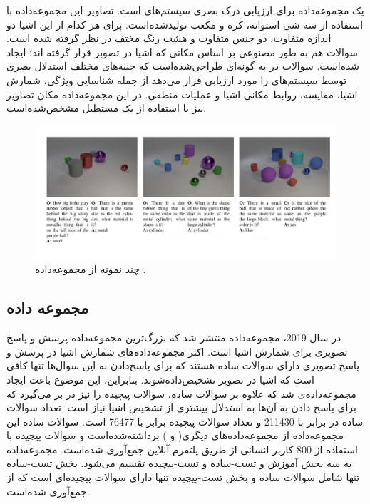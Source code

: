  یک مجموعه‌داده برای ارزیابی درک بصری سیستم‌های 
  است. تصاویر این مجموعه‌داده با استفاده از سه شی استوانه، کره و مکعب تولیدشده‌است. برای هر کدام از این اشیا دو اندازه متفاوت، دو جنس متفاوت و هشت رنگ مختف در نظر گرفته شده است. سوالات هم به طور مصنوعی بر اساس مکانی که اشیا در تصوبر قرار گرفته اند؛ ایجاد شده‌است. سوالات در
   به گونه‌ای طراحی‌شده‌است که جنبه‌های مختلف استدلال بصری توسط سیستم‌های 
   را مورد ارزیابی قرار می‌دهد از جمله شناسایی ویژگی، شمارش اشیا، مقایسه، روابط مکانی اشیا و عملیات منطقی. در این مجموعه‌داده مکان تصاویر نیز با استفاده از یک مستطیل مشخص‌شده‌است.
   
   \begin{figure}[h]
   	\centerline{\includegraphics[scale=0.4]{images/CLEVR.JPG}}
   	\caption{چند نمونه از مجموعه‌داده \cite{johnson2017clevr}.}
   	\label{fig:CLEVRExample}
   \end{figure}

\subsection{مجموعه داده \cite{acharya2019tallyqa}}

	در سال 2019، مجموعه‌داده 
منتشر شد که بزرگ‌ترین مجموعه‌داده پرسش و پاسخ تصویری برای شمارش اشیا است. اکثر مجموعه‌داده‌های شمارش اشیا در پرسش و پاسخ تصویری دارای سوالات ساده هستند که برای پاسخ‌دادن به این سوال‌‌ها تنها کافی است که اشیا در تصویر تشخیص‌داده‌شوند. بنابراین، این موضوع باعث ایجاد مجموعه‌داده‌ی 
  شد که علاوه بر سوالات ساده، سوالات پیچیده را نیز در بر می‌گیرد که برای پاسخ دادن به آن‌ها به استدلال بیشتری از تشخیص اشیا نیاز است. تعداد سوالات ساده در
  برابر با 211430 و تعداد سوالات پیچیده برابر با 76477 است. سوالات ساده این مجموعه‌داده از مجموعه‌داده‌های دیگری( 
   \cite{goyal2017making}
  و 
   \cite{krishna2017visual}
  ) برداشته‌شده‌است و سوالات پیچیده با استفاده از 800 کاربر انسانی از طریق پلتفرم آنلاین 
  جمع‌آوری شده‌است. مجموعه‌داده 
  به سه بخش آموزش و تست-ساده و تست-پیچیده تقسیم می‌شود. بخش تست-ساده تنها شامل سوالات ساده و بخش تست-پیچیده تنها دارای سوالات پیچیده‌ای است که از 
  جمع‌آوری شده‌است. 

